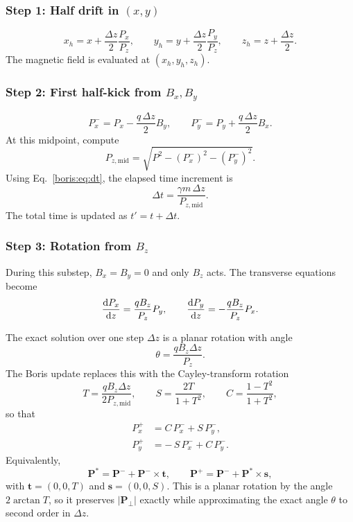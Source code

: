 \subsubsection{Step 1: Half drift in \((x,y)\)}
\[
x_h = x + \frac{\Delta z}{2}\frac{P_x}{P_z}, \qquad
y_h = y + \frac{\Delta z}{2}\frac{P_y}{P_z}, \qquad
z_h = z + \frac{\Delta z}{2}.
\]
The magnetic field is evaluated at \((x_h,y_h,z_h)\).

\subsubsection{Step 2: First half-kick from \(B_x,B_y\)}
\[
P_x^- = P_x - \frac{q\,\Delta z}{2}B_y, \qquad
P_y^- = P_y + \frac{q\,\Delta z}{2}B_x.
\]
At this midpoint, compute
\[
P_{z,\mathrm{mid}} = \sqrt{P^2 - (P_x^-)^2 - (P_y^-)^2}.
\]
Using Eq.~\eqref{boris:eq:dt}, the elapsed time increment is
\[
\Delta t = \frac{\gamma m\,\Delta z}{P_{z,\mathrm{mid}}}.
\]
The total time is updated as \(t' = t + \Delta t\).

\subsubsection{Step 3: Rotation from \(B_z\)}

During this substep, \(B_x=B_y=0\) and only \(B_z\) acts.
The transverse equations become
\begin{equation}
\frac{\text{d} {P_x}}{\text{d} {z}} = \frac{qB_z}{P_z} P_y, \qquad
\frac{\text{d} {P_y}}{\text{d} {z}} = -\frac{qB_z}{P_z} P_x.
\label{boris:eq:rot_eqs}
\end{equation}

The exact solution over one step \(\Delta z\) is a planar rotation with angle
\begin{equation}
\theta = \frac{q B_z \Delta z}{P_z}.
\label{boris:eq:rotation_exact}
\end{equation}
The Boris update replaces this with the Cayley-transform rotation
\[
T = \frac{qB_z \Delta z}{2P_{z,\mathrm{mid}}}, \qquad
S = \frac{2T}{1+T^2}, \qquad
C = \frac{1-T^2}{1+T^2},
\]
so that
\begin{align}
P_x^+ &= C\,P_x^- + S\,P_y^-,\\
P_y^+ &= -\,S\,P_x^- + C\,P_y^-.
\end{align}
Equivalently,
\[
\bm{P}^{*} = \bm{P}^- + \bm{P}^- \times \bm{t}, \qquad
\bm{P}^+ = \bm{P}^- + \bm{P}^{*} \times \bm{s},
\]
with \(\bm{t} = (0,0,T)\) and \(\bm{s} = (0,0,S)\).
This is a planar rotation by the angle \(2\arctan T\), so it preserves
\(|\bm{P}_\perp|\) exactly while approximating the exact angle \(\theta\) to
second order in \(\Delta z\).

